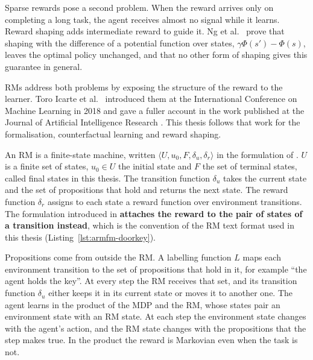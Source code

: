 \documentclass[11pt,english,listoffigures,listoftables]{tfgetsinf}
\begin{document}
Sparse rewards pose a second problem. When the reward arrives only on completing a long task, the agent receives almost no signal while it learns. Reward shaping adds intermediate reward to guide it. Ng et al.~\cite{ng1999policy} prove that shaping with the difference of a potential function over states, $\gamma\Phi(s') - \Phi(s)$, leaves the optimal policy unchanged, and that no other form of shaping gives this guarantee in general.

RMs address both problems by exposing the structure of the reward to the learner. Toro Icarte et al.~\cite{toroicarte2018using} introduced them at the International Conference on Machine Learning in 2018 and gave a fuller account in the work published at the Journal of Artificial Intelligence Research \cite{icarte2022reward}. This thesis follows that work for the formalisation, counterfactual learning and reward shaping.

An RM is a finite-state machine, written $\langle U, u_0, F, \delta_u, \delta_r\rangle$ in the formulation of \cite{icarte2022reward}. $U$ is a finite set of states, $u_0 \in U$ the initial state and $F$ the set of terminal states, called final states in this thesis. The transition function $\delta_u$ takes the current state and the set of propositions that hold and returns the next state. The reward function $\delta_r$ assigns to each state a reward function over environment transitions. The formulation introduced in \cite{toroicarte2018using} \textbf{attaches the reward to the pair of states of a transition instead}, which is the convention of the RM text format used in this thesis (Listing~\ref{lst:armfm-doorkey}).

Propositions come from outside the RM. A labelling function $L$ maps each environment transition to the set of propositions that hold in it, for example ``the agent holds the key''. At every step the RM receives that set, and its transition function $\delta_u$ either keeps it in its current state or moves it to another one. The agent learns in the product of the MDP and the RM, whose states pair an environment state with an RM state. At each step the environment state changes with the agent's action, and the RM state changes with the propositions that the step makes true. In the product the reward is Markovian even when the task is not.
\end{document}
